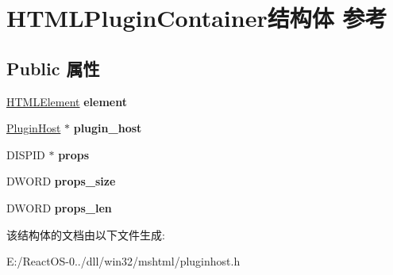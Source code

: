 \hypertarget{struct_h_t_m_l_plugin_container}{}\section{H\+T\+M\+L\+Plugin\+Container结构体 参考}
\label{struct_h_t_m_l_plugin_container}
\subsection*{Public 属性}
\begin{DoxyCompactItemize}
\item 
\mbox{\label{struct_h_t_m_l_plugin_container_aed5772d125b8d7692f28dd20fe7e75b0}} 
\hyperlink{struct_h_t_m_l_element}{H\+T\+M\+L\+Element} {\bfseries element}
\item 
\mbox{\label{struct_h_t_m_l_plugin_container_a807b7365bf2eba1d450eeb009e14cbed}} 
\hyperlink{struct_plugin_host}{Plugin\+Host} $\ast$ {\bfseries plugin\+\_\+host}
\item 
\mbox{\label{struct_h_t_m_l_plugin_container_a43c3a882b3b8a449435f01cb835d7ab6}} 
D\+I\+S\+P\+ID $\ast$ {\bfseries props}
\item 
\mbox{\label{struct_h_t_m_l_plugin_container_a1a7b44eeb22fd780b4582002afd8c10b}} 
D\+W\+O\+RD {\bfseries props\+\_\+size}
\item 
\mbox{\label{struct_h_t_m_l_plugin_container_ac3394d59717d446610cf300623f0387e}} 
D\+W\+O\+RD {\bfseries props\+\_\+len}
\end{DoxyCompactItemize}


该结构体的文档由以下文件生成\+:\begin{DoxyCompactItemize}
\item 
E\+:/\+React\+O\+S-\/0../dll/win32/mshtml/pluginhost.\+h\end{DoxyCompactItemize}
